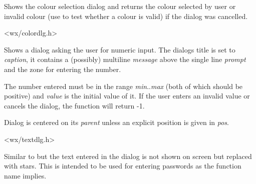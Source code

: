 \label{wxgetcolourfromuser}


Shows the colour selection dialog and returns the colour selected by user or
invalid colour (use  to test whether a colour
is valid) if the dialog was cancelled.





<wx/colordlg.h>

\label{wxgetnumberfromuser}


Shows a dialog asking the user for numeric input. The dialogs title is set to 
{\it caption}, it contains a (possibly) multiline {\it message} above the
single line {\it prompt} and the zone for entering the number.

The number entered must be in the range {\it min}..{\it max} (both of which
should be positive) and {\it value} is the initial value of it. If the user
enters an invalid value or cancels the dialog, the function will return -1.

Dialog is centered on its {\it parent} unless an explicit position is given in 
{\it pos}.


<wx/textdlg.h>

\label{wxgetpasswordfromuser}


Similar to  but the text entered
in the dialog is not shown on screen but replaced with stars. This is intended
to be used for entering passwords as the function name implies.

